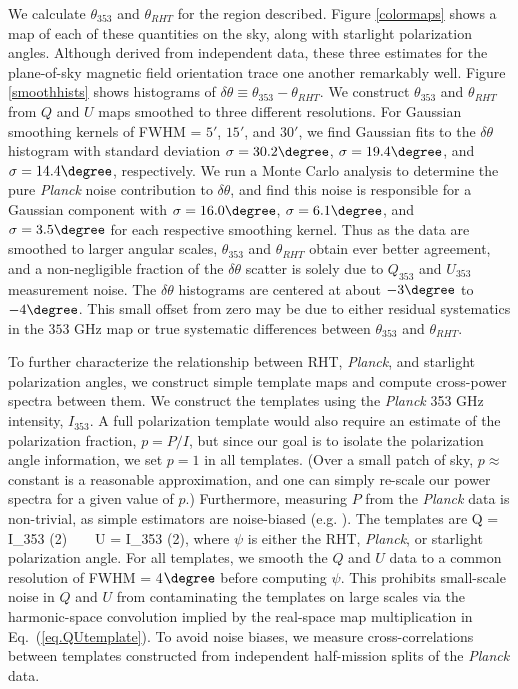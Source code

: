 We calculate $\theta_{353}$ and $\theta_{RHT}$ for the region described. Figure \ref{colormaps} shows a map of each of these quantities on the sky, along with starlight polarization angles. Although derived from independent data, these three estimates for the plane-of-sky magnetic field orientation trace one another remarkably well. Figure \ref{smoothhists} shows histograms of $\delta \theta \equiv \theta_{353} - \theta_{RHT}$. We construct $\theta_{353}$ and $\theta_{RHT}$ from $Q$ and $U$ maps smoothed to three different resolutions. For Gaussian smoothing kernels of FWHM = $5'$, $15'$, and $30'$, we find Gaussian fits to the $\delta \theta$ histogram with standard deviation $\sigma = 30.2\degree$, $\sigma = 19.4\degree$, and $\sigma = 14.4\degree$, respectively. We run a Monte Carlo analysis to determine the pure \textit{Planck} noise contribution to $\delta \theta$, and find this noise is responsible for a Gaussian component with $\sigma = 16.0\degree$, $\sigma = 6.1\degree$, and $\sigma = 3.5\degree$ for each respective smoothing kernel. Thus as the data are smoothed to larger angular scales, $\theta_{353}$ and $\theta_{RHT}$ obtain ever better agreement, and a non-negligible fraction of the $\delta \theta$ scatter is solely due to $Q_{353}$ and $U_{353}$ measurement noise. The $\delta \theta$ histograms are centered at about $-3\degree$ to $-4\degree$. This small offset from zero may be due to either residual systematics in the $353$ GHz map \cite{Collaboration:2015ta} or true systematic differences between $\theta_{353}$ and $\theta_{RHT}$.

To further characterize the relationship between RHT, \textit{Planck}, and starlight polarization angles, we construct simple template maps and compute cross-power spectra between them. We construct the templates using the \textit{Planck} 353 GHz intensity, $I_{353}$. A full polarization template would also require an estimate of the polarization fraction, $p=P/I$, but since our goal is to isolate the polarization angle information, we set $p=1$ in all templates. (Over a small patch of sky, $p \approx$ constant is a reasonable approximation, and one can simply re-scale our power spectra for a given value of $p$.) Furthermore, measuring $P$ from the \textit{Planck} data is non-trivial, as simple estimators are noise-biased (e.g. \cite{Plaszczynski:2013gg}). The templates are 
\beq
Q = I_{353} \cos(2\psi) \,\,\,  \,\,\, U = I_{353} \sin(2\psi),
\label{eq.QUtemplate}
\eeq
where $\psi$ is either the RHT, \textit{Planck}, or starlight polarization angle. For all templates, we smooth the $Q$ and $U$ data to a common resolution of FWHM = 4$\degree$ before computing $\psi$. This prohibits small-scale noise in $Q$ and $U$ from contaminating the templates on large scales via the harmonic-space convolution implied by the real-space map multiplication in Eq.~(\ref{eq.QUtemplate}). 
To avoid noise biases, we measure cross-correlations between templates constructed from independent half-mission splits of the \textit{Planck} data.

